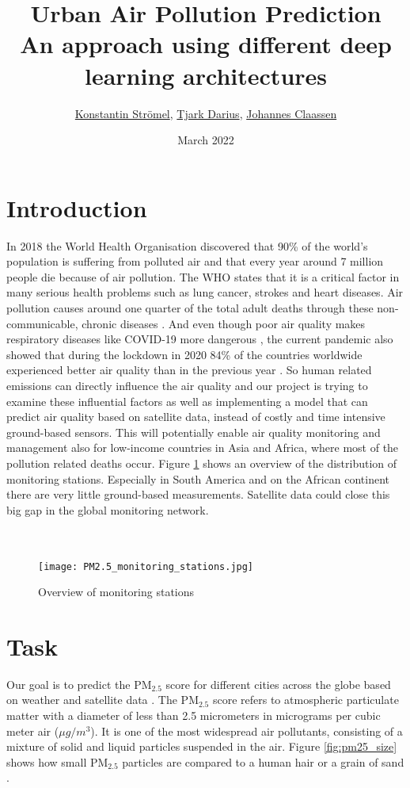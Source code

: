 \documentclass{article}
\title{\Huge Urban Air Pollution Prediction \\
\Large An approach using different deep learning architectures}
\author{\href{mailto:kstroemel@uos.de}%
{Konstantin Strömel}, \href{mailto:tdarius@uos.de}%
{Tjark Darius}, \href{mailto:jclaassen@uos.de}%
{Johannes Claassen}}
\date{March 2022}
\begin{document}
\maketitle

\section{Introduction}
In 2018 the World Health Organisation discovered that 90\% of the world's population is suffering from polluted air and that every year around 7 million people die because of air pollution. The WHO states that it is a critical factor in many serious health problems such as lung cancer, strokes and heart diseases. Air pollution causes around one quarter of the total adult deaths through these non-communicable, chronic diseases  \citep{who_air-pollution}.
And even though poor air quality makes respiratory diseases like  COVID-19 more dangerous \citep{iqair_empowering}, the current pandemic also showed that during the lockdown in 2020 84\% of the countries worldwide experienced better air quality than in the previous year \citep{cnn_pandemic-air-quality}.
So human related emissions can directly influence the air quality and our project is trying to examine these influential factors as well as implementing a model that can predict air quality based on satellite data, instead of costly and time intensive  ground-based sensors. This will potentially enable air quality monitoring and management also for low-income countries in Asia and Africa, where most of the pollution related deaths occur. Figure \ref{fig:monitoring} shows an overview of the distribution of monitoring stations. Especially in South America and on the African continent there are very little ground-based measurements. Satellite data could close this big gap in the global monitoring network. \\
\\
\\
\begin{figure}[htb!]
\centering
\texttt{[image: PM2.5\_monitoring\_stations.jpg]}
\caption{Overview of monitoring stations \citep{iqair_empowering}}
\label{fig:monitoring}
\end{figure}

\newpage
\section{Task}
Our goal is to predict the PM$_{2.5}$ score for different cities across the globe based on weather and satellite data \citep{noauthor_zindiweekendz_nodate}.
The PM$_{2.5}$ score refers to atmospheric particulate matter with a diameter of less than 2.5 micrometers in micrograms per cubic meter air ($\mu g / m^3$). It is one of the most widespread air pollutants, consisting of a mixture of solid and liquid particles suspended in the air. Figure \ref{fig:pm25_size} shows how small PM$_{2.5}$ particles are compared to a human hair or a grain of sand \citep{us_epa_particulate_2016}. \\
\end{document}
